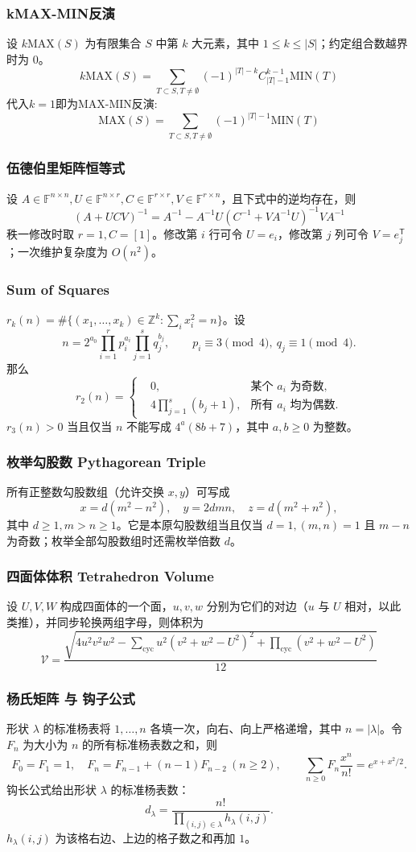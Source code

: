 \begin{footnotesize}
\subsubsection{kMAX-MIN反演}
设 $k\mathrm{MAX}(S)$ 为有限集合 $S$ 中第 $k$ 大元素，其中
$1\le k\le |S|$；约定组合数越界时为 $0$。
\[k \mathrm{MAX}(S)=\sum_{T\subset S, T\neq \emptyset}(-1)^{|T|-k}C_{|T|-1}^{k-1}\mathrm{MIN}(T)\]
代入$k=1$即为MAX-MIN反演:
\[\mathrm{MAX}(S)=\sum_{T\subset S, T\neq \emptyset}(-1)^{|T|-1}\mathrm{MIN}(T)\]
\subsubsection{伍德伯里矩阵恒等式}
设 $A\in\mathbb F^{n\times n},U\in\mathbb F^{n\times r},
C\in\mathbb F^{r\times r},V\in\mathbb F^{r\times n}$，且下式中的逆均存在，则
$$(A+UCV)^{-1}=A^{-1}-A^{-1}U(C^{-1}+VA^{-1}U)^{-1}VA^{-1}$$
秩一修改时取 $r=1,C=[1]$。修改第 $i$ 行可令 $U=e_i$，修改第 $j$ 列可令 $V=e_j^\mathsf T$；一次维护复杂度为 $O(n^2)$。
\subsubsection{Sum of Squares}
$r_k(n)=\#\{(x_1,\ldots,x_k)\in\mathbb Z^k:\sum_i x_i^2=n\}$。设
\[n=2^{a_0}\prod_{i=1}^r p_i^{a_i}\prod_{j=1}^s q_j^{b_j},\qquad
p_i\equiv3\pmod4,\ q_j\equiv1\pmod4.\]
那么
\[r_2(n)=\left\{\begin{aligned}
&0, & \text{某个 }a_i\text{ 为奇数},\\
&4\prod_{j=1}^s(b_j+1), & \text{所有 }a_i\text{ 均为偶数}.
\end{aligned}\right.\]
$r_3(n)>0$ 当且仅当 $n$ 不能写成 $4^a(8b+7)$，其中 $a,b\ge0$ 为整数。
\subsubsection{枚举勾股数 Pythagorean Triple}
所有正整数勾股数组（允许交换 $x,y$）可写成
\[x=d(m^2-n^2),\quad y=2dmn,\quad z=d(m^2+n^2),\]
其中 $d\ge1,m>n\ge1$。它是本原勾股数组当且仅当
$d=1,(m,n)=1$ 且 $m-n$ 为奇数；枚举全部勾股数组时还需枚举倍数 $d$。
\subsubsection{四面体体积 Tetrahedron Volume}
设 $U,V,W$ 构成四面体的一个面，$u,v,w$ 分别为它们的对边（$u$ 与 $U$ 相对，以此类推），并同步轮换两组字母，则体积为
\[ \mathcal V = \frac{\sqrt{ 4u^2v^2w^2 - \sum_{\mathrm{cyc}}{u^2(v^2+w^2-U^2)^2} + \prod_{\mathrm{cyc}}{(v^2+w^2-U^2)} }}{12} \]
\subsubsection{杨氏矩阵 与 钩子公式}
形状 $\lambda$ 的标准杨表将 $1,\ldots,n$ 各填一次，向右、向上严格递增，其中 $n=|\lambda|$。令 $F_n$ 为大小为 $n$ 的所有标准杨表数之和，则
\[F_0=F_1=1,\quad F_n=F_{n-1}+(n-1)F_{n-2}\ (n\ge2),\qquad
\sum_{n\ge0}F_n\frac{x^n}{n!}=e^{x+x^2/2}.\]
钩长公式给出形状 $\lambda$ 的标准杨表数：
\[d_\lambda=\frac{n!}{\prod_{(i,j)\in\lambda}h_\lambda(i,j)}.\]
$h_\lambda(i,j)$ 为该格右边、上边的格子数之和再加 $1$。


\end{footnotesize}
